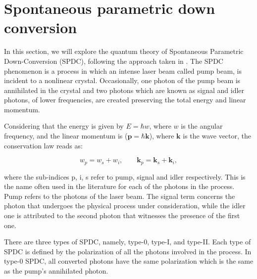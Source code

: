 \documentclass[12pt]{book}
\begin{document}
 
  
\pagebreak



\chapter[SPDC]{Spontaneous parametric down conversion}



In this section, we will explore the quantum theory of Spontaneous Parametric Down-Conversion (SPDC), following the approach taken in \cite{procopio,multiphoton}. The SPDC phenomenon is a process in which an intense laser beam called pump beam, is incident to a nonlinear crystal. Occasionally, one photon of the pump beam is annihilated in the crystal and two photons which are known as signal and idler photons, of lower frequencies, are created preserving the total energy and linear momentum.

Considering that the energy is given by $E=\hbar w$, where $w$ is the angular frequency, and the linear momentum is ($\mathbf{p}=\hbar \mathbf{k}$), where $\mathbf{k}$ is the wave vector, the conservation law reads as:

\begin{equation}
w_{p}=w_{s}+w_{i}, \qquad \mathbf{k}_{p}=\mathbf{k}_{s}+\mathbf{k}_{i}, \label{conservation}
\end{equation}

where the sub-indices p, i, s refer to pump, signal and idler respectively. This is the name often used in the literature for each of the photons in the process. Pump refers to the photons of the laser beam. The signal term concerns the photon that undergoes the physical process under consideration, while the idler one is attributed to the second photon that witnesses the presence of the first one.

There are three types of SPDC, namely, type-0, type-I, and type-II. Each type of SPDC is defined by the polarization of all the photons involved in the process. In type-0 SPDC, all converted photons have the same polarization which is the same as the pump's annihilated photon.
\end{document}
